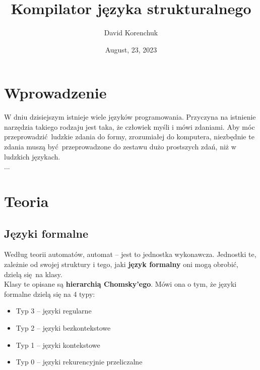 \documentclass[a4paper, 12pt]{extarticle}
\title{Kompilator języka strukturalnego}
\author{David Korenchuk}
\date{August, 23, 2023}
\begin{document}
    \pagestyle{fancy}
    \lhead{\leftmark}
    \rhead{\thetitle}

    \maketitle
    
    \newpage
    
    \tableofcontents

    \newpage
	
	
	\section{Wprowadzenie}
	
		W dniu dzisiejszym istnieje wiele języków programowania. Przyczyna na istnienie narzędzia takiego
		rodzaju jest taka, że człowiek myśli i mówi zdaniami. Aby móc przeprowadzić ludzkie zdania do
		formy, zrozumiałej do komputera, niezbędnie te zdania muszą być przeprowadzone do zestawu dużo
		prostszych zdań, niż w ludzkich językach.
		\\

		...


		\newpage
		
	\section{Teoria}

		\subsection{Języki formalne}

			Według teorii automatów, automat -- jest to jednostka wykonawcza. Jednostki te, zależnie od swojej
			struktury i tego, jaki \textbf{język formalny} oni mogą obrobić, dzielą się na klasy.
			\\
			
			Klasy te opisane są \textbf{hierarchią Chomsky’ego}. Mówi ona o tym, że języki formalne dzielą się na
			4 typy:
			\begin{itemize}
				\item Typ 3 -- języki regularne
				\item Typ 2 -- języki bezkontekstowe
				\item Typ 1 -- języki kontekstowe
				\item Typ 0 -- języki rekurencyjnie przeliczalne
			\end{itemize}
			
\end{document}
